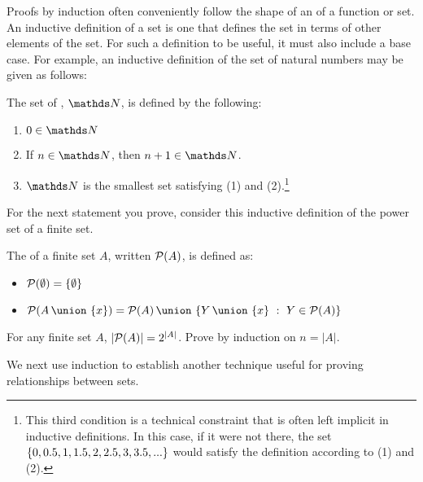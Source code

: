 \begin{discussion}
Proofs by induction often conveniently follow the shape of an  of a function or set. An inductive definition of a set is one that defines the set in terms of other elements of the set. For such a definition to be useful, it must also include a base case. For example, an inductive definition of the set of natural numbers may be given as follows:
\end{discussion}

\begin{defn}
The set of , $\naturals$, is defined by the following:
\begin{enumerate}
\item $0 \in \naturals$
\item If $n \in \naturals$, then $n+1 \in \naturals$.
\item $\naturals$ is the smallest set satisfying (1) and (2).\footnote{This third condition is a technical constraint that is often left implicit in inductive definitions. In this case, if it were not there, the set $\left\lbrace 0, 0.5, 1, 1.5, 2, 2.5, 3, 3.5, ... \right\rbrace$ would satisfy the definition according to (1) and (2).}
\end{enumerate}
\end{defn}

\begin{discussion}
For the next statement you prove, consider this inductive definition of the power set of a finite set.
\end{discussion}

\begin{defn}
The  of a finite set $A$, written $\mathcal{P}(A)$, is defined as:
\begin{itemize}
\item $\mathcal{P}(\emptyset) = \left\lbrace \emptyset \right\rbrace$
\item $\powerset{\setunion{A}{\setdef x}} = \setunion{\powerset{A}}{ \setbuild{\setunion{Y}{\setdef{x}}}{Y \in \powerset{A}}  }$
\end{itemize}
\end{defn}

\begin{stmt}
For any finite set $A$, $|\mathcal{P}(A)| = 2^{|A|}$. 
\hint Prove by induction on $n = |A|$.
\end{stmt}

\begin{discussion}
We next use induction to establish another technique useful for proving relationships between sets.
\end{discussion}

